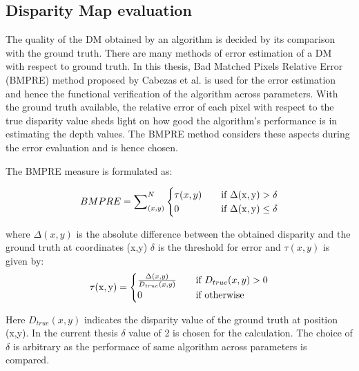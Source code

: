 \subsection{Disparity Map evaluation}
\label{s:stereovision:bmpre}

The quality of the DM obtained by an algorithm is decided by its comparison with the ground truth. There are many methods of error estimation of a DM with respect to ground truth. In this thesis, Bad Matched Pixels Relative Error (BMPRE) method proposed by Cabezas et al. \cite{Cabezas2012} is used for the error estimation and hence the functional verification of the algorithm across parameters. With the ground truth available, the relative error of each pixel with respect to the true disparity value sheds light on how good the algorithm's performance is in estimating the depth values. The BMPRE method considers these aspects during the error evaluation and is hence chosen.

The BMPRE measure is formulated as:

\begin{equation}
 BMPRE =\sum\nolimits_{(x,y)}^{N}
   \begin{cases}
    \tau(x,y)       & \quad \text{if } \Delta({\rm x}, {\rm y}) > \delta\\
    0  & \quad \text{if } \Delta({\rm x}, {\rm y})\leq \delta\\
  \end{cases}
  \label{eqn:bmpre}
\end{equation}

where $\Delta(x,y)$ is the absolute difference between the obtained disparity and the ground truth at coordinates (x,y) $\delta$ is the threshold for error and $\tau(x,y)$ is given by:
\[
  \tau({\rm x}, {\rm y})=
  \begin{cases}
    \Delta(x,y)\over {D}_{true}(x,y)       & \quad \text{if } {D}_{true}(x,y) > 0\\
    0  & \quad \text{if } \text{otherwise}\\
  \end{cases}
\]

Here ${D}_{true}(x,y)$ indicates the disparity value of the ground truth at position (x,y). In the current thesis $\delta$ value of 2 is chosen for the calculation. The choice of $\delta$ is arbitrary as the performace of same algorithm across parameters is compared.

